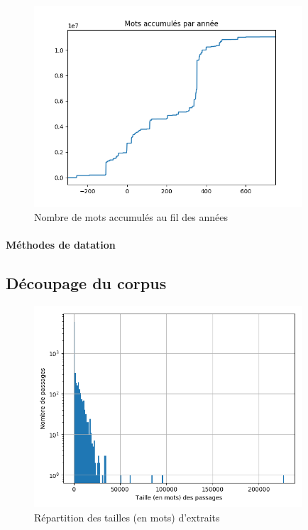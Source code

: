 \begin{figure}[h]
    \centering
    \includegraphics[width=10cm]{../results/analysis/corpus_analysis/accumulated_tokens.png}
    \caption{Nombre de mots accumulés au fil des années}
    \label{accumulated_tokens_per_year}
\end{figure}


\paragraph{Méthodes de datation}

\subsection{Découpage du corpus}
\label{subsec:corpus_decoupage}

\begin{figure}[h]
    \centering
    \includegraphics[width=10cm]{../results/analysis/corpus_analysis/passage_size_distribution.png}
    \caption{Répartition des tailles (en mots) d'extraits}
    \label{passage_size_distribution}
\end{figure}

